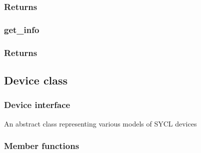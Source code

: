 \documentclass[letterpaper,10pt,english]{sphinxmanual}
\begin{document}
\subsubsection*{Returns}


\subsubsection{get\_info}
\label{\detokenize{programming-interface/runtime/context:get-info}}
\begin{sphinxVerbatim}[commandchars=\\\{\}]
  
    
\end{sphinxVerbatim}
\subsubsection*{Returns}


\subsection{Device class}
\label{\detokenize{programming-interface/runtime/device:device-class}}\label{\detokenize{programming-interface/runtime/device::doc}}

\subsubsection{Device interface}
\label{\detokenize{programming-interface/runtime/device:device-interface}}
\begin{sphinxVerbatim}[commandchars=\\\{\}]
 
\end{sphinxVerbatim}

An abstract class representing various models of SYCL devices
\subsubsection*{Member functions}
\end{document}
